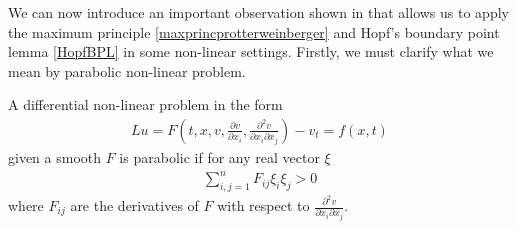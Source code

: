 We can now introduce an important observation shown in \cite{protterweinberger} that allows us to apply the maximum principle \ref{maxprincprotterweinberger} and Hopf's boundary point lemma \ref{HopfBPL} in some non-linear settings.  Firstly, we must clarify what we mean by parabolic non-linear problem. 
\begin{defin}\label{nonlinearpde}
	A differential non-linear problem in the form 
	\begin{align}
		Lu= F\left(t, x, v, \frac{\partial v}{\partial x_i} , \frac{\partial^2 v}{\partial x_i \partial x_j}\right)-v_t = f(x, t)\label{nonlinearexample}
	\end{align} 
	given a smooth $F$ is parabolic if for any real vector $\xi$
	\begin{align*}
		\sum_{i, j=1}^n F_{ij}\xi_i\xi_j >0
	\end{align*} 
	where $F_{ij}$ are the derivatives of $F$ with respect to $\frac{\partial^2 v}{\partial x_i \partial x_j}$. 
\end{defin}
\begin{comment}
	First, let's introduce an easier example from \cite{GidasNirenberg}: 
	Suppose that $u$ solves:
	\begin{align}
		u_t-L u+f(u)=0 \label{non-linear}
	\end{align}
	For an elliptic operator $L$, and where $u_t=\frac{\partial u}{\partial t}$. We note that this differs from the usual parabolic equation because here $f$ depends from the solution $u$, potentially in non-trivial ways, making the equation non-linear. 
	If a solution exists, and $f$ is a $C^1$ function, by the theorem of the mean, at any point $x$ in the domain of $u$ we can find a function $\xi(x)$ such that
	\begin{align*}
		f'(\xi(x))&=\frac{f(u(x))-f(0)}{u(x)-0}\\
		f'(\xi(x))u&=f(u(x))-f(0)
	\end{align*} 
	If $u$ solves (\ref{non-linear}), and if $f(0)\leq0$, then 
	\begin{align*}
		u_t-L u+f(u)-f(0) &\geq 0\\
		u_t-L u+ f'(\xi(x))u&\geq 0 \\
		u_t-L u+ c(x)u&\geq 0
	\end{align*}
	Hence the function $u$ is the super-solution to a (different) linear parabolic partial differential equation and hence we can apply the maximum principle \ref{maxprincprotterweinberger} and Hopf's boundary point lemma \ref{HopfBPL} to solutions of (\ref{non-linear}) as long as the other hypothesis apply to $c(x)$. 
\end{comment}
